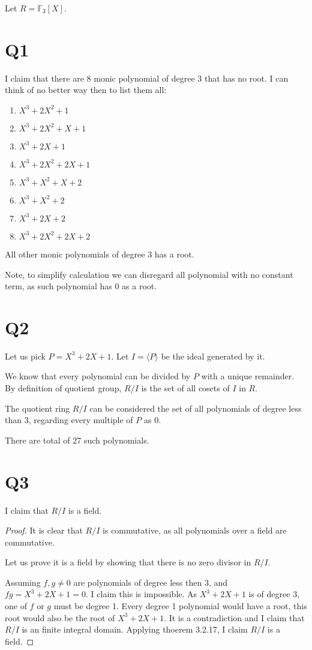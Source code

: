 \documentclass[12pt, a4paper]{article}
\theoremstyle{definition}
\theoremstyle{remark}
\begin{document}
Let $R = \mathbb{F}_3[X]$.

\section{Q1}

I claim that there are 8 monic polynomial of degree 3 that has no root.
I can think of no better way then to list them all:
\begin{enumerate}
	\item $X^3+2X^2+1$
	\item $X^3 + 2X^2+ X+1$
	\item $X^3+2X+1$
	\item $X^3+2X^2+2X+1$
	\item $X^3+X^2+X+2$
	\item $X^3+X^2+2$
	\item $X^3+2X+2$
	\item $X^3+2X^2+2X+2$
\end{enumerate}

All other monic polynomials of degree 3 has a root. 

Note, to simplify calculation we can disregard all polynomial with no constant term, as such polynomial has $0$ as a root.

\section{Q2}

Let us pick $P = X^3+2X+1$. Let $I = \langle P \rangle$ be the ideal generated by it.

We know that every polynomial can be divided by $P$ with a unique remainder. By definition of quotient group, $R/I$ is the set of all cosets of $I$ in $R$.

The quotient ring $R/I$ can be considered the set of all polynomials of degree less than 3, regarding every multiple of $P$ as 0.

There are total of 27 such polynomials.

\section{Q3}

I claim that $R/I$ is a field.

\begin{proof}
	It is clear that $R/I$ is commutative, as all polynomials over a field are commutative.

	Let us prove it is a field by showing that there is no zero divisor in $R/I$.
	
	Assuming $f,g \neq 0$ are polynomials of degree less then 3, and $fg = X^3+2X+1 = 0$.  
	I claim this is impossible. As $X^3+2X+1$ is of degree 3, one of $f$ or $g$ must be degree 1. 
	Every degree 1 polynomial would have a root, this root would also be the root of $X^3+2X+1$.
	It is a contradiction and I claim that $R/I$ is an finite integral domain.
	Applying thoerem 3.2.17, I claim $R/I$ is a field.
\end{proof}
\end{document}
